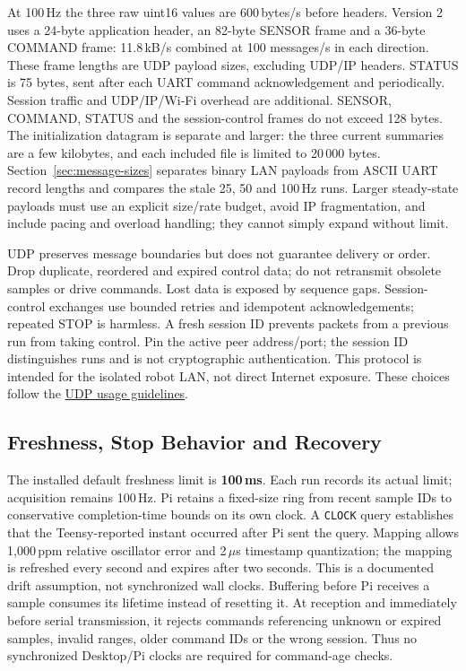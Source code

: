At 100\,Hz the three raw uint16 values are 600\,bytes/s before headers. Version 2 uses a 24-byte application header, an 82-byte SENSOR frame and a 36-byte COMMAND frame: 11.8\,kB/s combined at 100 messages/s in each direction. These frame lengths are UDP payload sizes, excluding UDP/IP headers. STATUS is 75 bytes, sent after each UART command acknowledgement and periodically. Session traffic and UDP/IP/Wi-Fi overhead are additional. SENSOR, COMMAND, STATUS and the session-control frames do not exceed 128 bytes. The initialization datagram is separate and larger: the three current summaries are a few kilobytes, and each included file is limited to 20\,000 bytes. Section~\ref{sec:message-sizes} separates binary LAN payloads from ASCII UART record lengths and compares the stale 25, 50 and 100\,Hz runs. Larger steady-state payloads must use an explicit size/rate budget, avoid IP fragmentation, and include pacing and overload handling; they cannot simply expand without limit.

UDP preserves message boundaries but does not guarantee delivery or order. Drop duplicate, reordered and expired control data; do not retransmit obsolete samples or drive commands. Lost data is exposed by sequence gaps. Session-control exchanges use bounded retries and idempotent acknowledgements; repeated STOP is harmless. A fresh session ID prevents packets from a previous run from taking control. Pin the active peer address/port; the session ID distinguishes runs and is not cryptographic authentication. This protocol is intended for the isolated robot LAN, not direct Internet exposure. These choices follow the \href{https://www.rfc-editor.org/rfc/rfc8085.html}{UDP usage guidelines}.

\subsection{Freshness, Stop Behavior and Recovery}
The installed default freshness limit is \textbf{100\,ms}. Each run records its actual limit; acquisition remains 100\,Hz. Pi retains a fixed-size ring from recent sample IDs to conservative completion-time bounds on its own clock. A \texttt{CLOCK} query establishes that the Teensy-reported instant occurred after Pi sent the query. Mapping allows 1,000\,ppm relative oscillator error and 2\,$\mu$s timestamp quantization; the mapping is refreshed every second and expires after two seconds. This is a documented drift assumption, not synchronized wall clocks. Buffering before Pi receives a sample consumes its lifetime instead of resetting it. At reception and immediately before serial transmission, it rejects commands referencing unknown or expired samples, invalid ranges, older command IDs or the wrong session. Thus no synchronized Desktop/Pi clocks are required for command-age checks.

